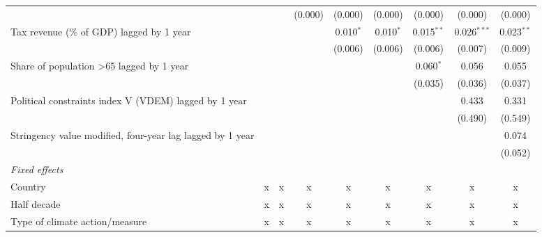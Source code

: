 \begin{tabular}{lcccccccc}
                                                                                  &         &         & (0.000) & (0.000)      & (0.000)      & (0.000)      & (0.000)       & (0.000)\\   
   Tax revenue (\% of GDP) lagged by 1 year                                       &         &         &         & 0.010$^{*}$  & 0.010$^{*}$  & 0.015$^{**}$ & 0.026$^{***}$ & 0.023$^{**}$\\   
                                                                                  &         &         &         & (0.006)      & (0.006)      & (0.006)      & (0.007)       & (0.009)\\   
   Share of population >65 lagged by 1 year                                       &         &         &         &              &              & 0.060$^{*}$  & 0.056         & 0.055\\   
                                                                                  &         &         &         &              &              & (0.035)      & (0.036)       & (0.037)\\   
   Political constraints index V (VDEM) lagged by 1 year                          &         &         &         &              &              &              & 0.433         & 0.331\\   
                                                                                  &         &         &         &              &              &              & (0.490)       & (0.549)\\   
   Stringency value modified, four-year lag lagged by 1 year                      &         &         &         &              &              &              &               & 0.074\\   
                                                                                  &         &         &         &              &              &              &               & (0.052)\\   
   \emph{Fixed effects}\\
   Country                                                                        & x       & x       & x       & x            & x            & x            & x             & x\\  
   Half decade                                                                    & x       & x       & x       & x            & x            & x            & x             & x\\  
   Type of climate action/measure                                                 & x       & x       & x       & x            & x            & x            & x             & x\\  

\end{tabular}
